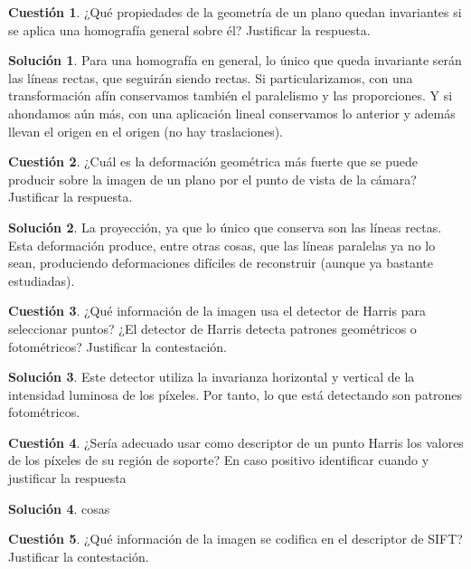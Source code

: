 \documentclass[a4paper, 11pt]{article}
\theoremstyle{definition}
\newtheorem{cuestion}{Cuestión}
\newtheorem*{solucion}{Solución}
\begin{document}
  \begin{cuestion}
    ¿Qué propiedades de la geometría de un plano quedan invariantes si se aplica
    una homografía general sobre él? Justificar la respuesta.
  \end{cuestion}

  \begin{solucion}
    Para una homografía en general, lo único que queda invariante serán las líneas
    rectas, que seguirán siendo rectas. Si particularizamos, con una transformación
    afín conservamos también el paralelismo y las proporciones. Y si ahondamos aún más, con
    una aplicación lineal conservamos lo anterior y además llevan el origen en el origen
    (no hay traslaciones).
  \end{solucion}

  \begin{cuestion}
    ¿Cuál es la deformación geométrica más fuerte que se puede producir sobre
    la imagen de un plano por el punto de vista de la cámara? Justificar la respuesta.
  \end{cuestion}

  \begin{solucion}
    La proyección, ya que lo único que conserva son las líneas rectas. Esta deformación
    produce, entre otras cosas, que las líneas paralelas ya no lo sean, produciendo
    deformaciones difíciles de reconstruir (aunque ya bastante estudiadas).
  \end{solucion}


  \begin{cuestion}
    ¿Qué información de la imagen usa el detector de Harris para seleccionar
    puntos? ¿El detector de Harris detecta patrones geométricos o fotométricos?
    Justificar la contestación.
  \end{cuestion}

  \begin{solucion}
     	Este detector utiliza la invarianza horizontal y vertical de la intensidad
      luminosa de los píxeles. Por tanto, lo que está detectando son patrones
      fotométricos.
  \end{solucion}
  \begin{cuestion}
    ¿Sería adecuado usar como descriptor de un punto Harris los valores de
    los píxeles de su región de soporte? En caso positivo identificar cuando y
    justificar la respuesta
  \end{cuestion}

  \begin{solucion}
     	cosas
  \end{solucion}
  \begin{cuestion}
    ¿Qué información de la imagen se codifica en el descriptor de SIFT?
    Justificar la contestación.
  \end{cuestion}
\end{document}

